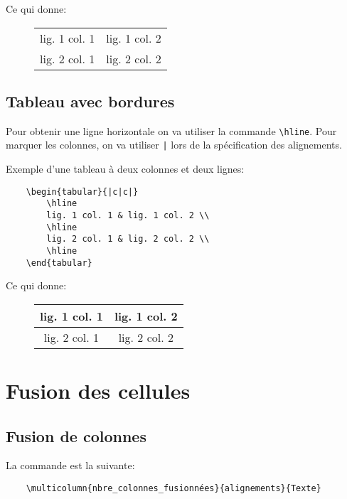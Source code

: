 Ce qui donne:
\begin{figure}[!h]
\begin{center}
\begin{tabular}{cc}
        lig. 1 col. 1 & lig. 1 col. 2 \\
        lig. 2 col. 1 & lig. 2 col. 2 \\
\end{tabular}
\end{center}
\end{figure}
\medskip

\subsection*{Tableau avec bordures}
Pour obtenir une ligne horizontale on va utiliser la commande \verb|\hline|. Pour marquer les colonnes, on va utiliser \og \texttt{|}\fg{} lors de la spécification des alignements.
\medskip

Exemple d'une tableau à deux colonnes et deux lignes:
\begin{verbatim}
    \begin{tabular}{|c|c|}
        \hline
        lig. 1 col. 1 & lig. 1 col. 2 \\
        \hline
        lig. 2 col. 1 & lig. 2 col. 2 \\
        \hline
    \end{tabular}
\end{verbatim}
\medskip

Ce qui donne:
\begin{figure}[!h]
\begin{center}
\begin{tabular}{|c|c|}
\hline
lig. 1 col. 1 & lig. 1 col. 2 \\
\hline
lig. 2 col. 1 & lig. 2 col. 2 \\
\hline
\end{tabular}
\end{center}
\end{figure}
\medskip

\section{Fusion des cellules}
\subsection*{Fusion de colonnes}
La commande est la suivante:
\begin{verbatim}
    \multicolumn{nbre_colonnes_fusionnées}{alignements}{Texte}
\end{verbatim}
\medskip


